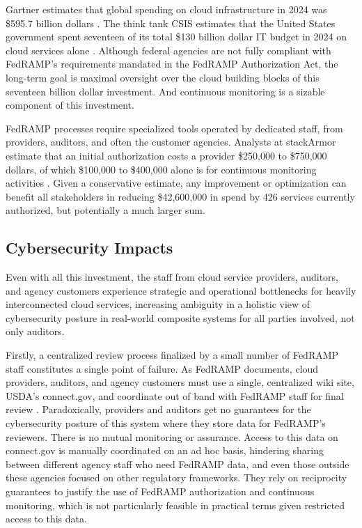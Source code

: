 \documentclass{jdf}
\begin{document}
Gartner estimates that global spending on cloud infrastructure in 2024 was \$595.7 billion dollars \citeyear{gartner24}. The think tank CSIS estimates that the United States government spent seventeen of its total \$130 billion dollar IT budget in 2024 on cloud services alone \citeyear[p.~1]{csis25}. Although federal agencies are not fully compliant with FedRAMP's requirements mandated in the FedRAMP Authorization Act, the long-term goal is maximal oversight over the cloud building blocks of this seventeen billion dollar investment. And continuous monitoring is a sizable component of this investment.

FedRAMP processes require specialized tools operated by dedicated staff, from providers, auditors, and often the customer agencies. Analysts at stackArmor estimate that an initial authorization costs a provider \$250,000 to \$750,000 dollars, of which \$100,000 to \$400,000 alone is for continuous monitoring activities \citeyear{stackarmor24}. Given a conservative estimate, any improvement or optimization can benefit all stakeholders in reducing \$42,600,000 in spend by 426 services currently authorized, but potentially a much larger sum.

\subsection{Cybersecurity Impacts}

Even with all this investment, the staff from cloud service providers, auditors, and agency customers experience strategic and operational bottlenecks for heavily interconnected cloud services, increasing ambiguity in a holistic view of cybersecurity posture in real-world composite systems for all parties involved, not only auditors. 

Firstly, a centralized review process finalized by a small number of FedRAMP staff constitutes a single point of failure. As FedRAMP documents, cloud providers, auditors, and agency customers must use a single, centralized wiki site, USDA's connect.gov, and coordinate out of band with FedRAMP staff for final review \citeyear[pp.~3,14]{fedramp_auth_playbook25}. Paradoxically, providers and auditors get no guarantees for the cybersecurity posture of this system where they store data for FedRAMP's reviewers. There is no mutual monitoring or assurance. Access to this data on connect.gov is manually coordinated on an ad hoc basis, hindering sharing between different agency staff who need FedRAMP data, and even those outside these agencies focused on other regulatory frameworks. They rely on reciprocity guarantees to justify the use of FedRAMP authorization and continuous monitoring, which is not particularly feasible in practical terms given restricted access to this data.
\end{document}
